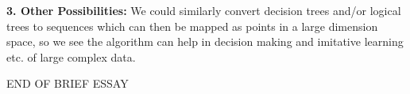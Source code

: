 \documentclass[english]{article}
\begin{document}
\medskip{}


\textbf{\large 3. Other Possibilities:} We could similarly convert
decision trees and/or logical trees to sequences which can then be
mapped as points in a large  dimension space, so we see the algorithm
can help in decision making and imitative learning etc. of large complex
data.

\medskip{}


END OF BRIEF ESSAY 
\end{document}
